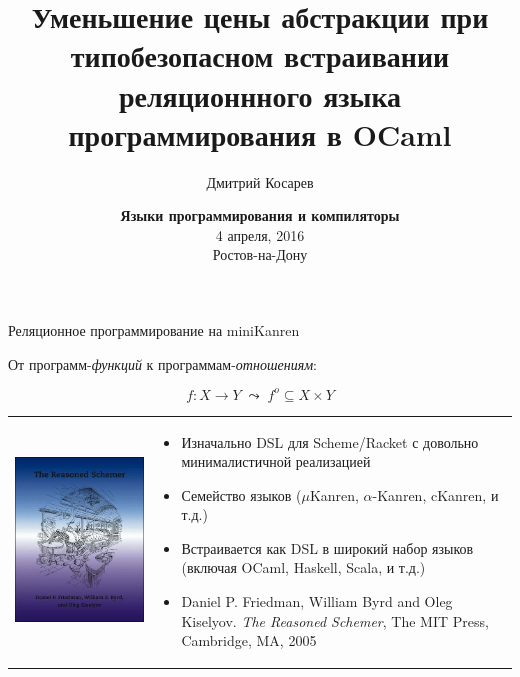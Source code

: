\documentclass[10pt, mathserif]{beamer}
\title{Уменьшение цены абстракции при типобезопасном встраивании реляционнного
языка программирования в OCaml}
\author{Дмитрий Косарев}
\institute[]{
\small{
\textbf{Санкт-Петербургский Государтсвенный Университет} \\
\textbf{JetBrains Research}
}
}
\date{
   \vskip 1cm
   \small{
   \textbf{Языки программирования и компиляторы}\\
   4 апреля, 2016 \\
   Ростов-на-Дону}
}
\newcommand{\oo}[1]{{#1}^o}
\theoremstyle{definition}
\begin{document}
\begin{frame}
  \titlepage
\end{frame}

\begin{frame}{Реляционное программирование на miniKanren}
 \begin{center}
 От программ-\emph{функций} к программам-\emph{отношениям}:
 \end{center}

 $$
 f \colon X \to Y\;\leadsto\;\oo{f} \subseteq X\times Y
 $$
 \vskip5mm
 \begin{tabular}{m{4cm}m{6cm}}
    \includegraphics[scale=0.3]{trs.jpg} &
    \begin{itemize}
       \item Изначально DSL для Scheme/Racket с довольно минималистичной реализацией
       \item Семейство языков ($\mu$Kanren, $\alpha$-Kanren, cKanren, и т.д.)
       \item Встраивается как DSL в широкий набор языков (включая OCaml, Haskell, Scala, и т.д.)
       \item Daniel P. Friedman, William Byrd and Oleg Kiselyov. \emph{The Reasoned Schemer},
       The MIT Press, Cambridge, MA, 2005
    \end{itemize}
 \end{tabular}
 \vskip 3cm
\end{frame}
\end{document}
